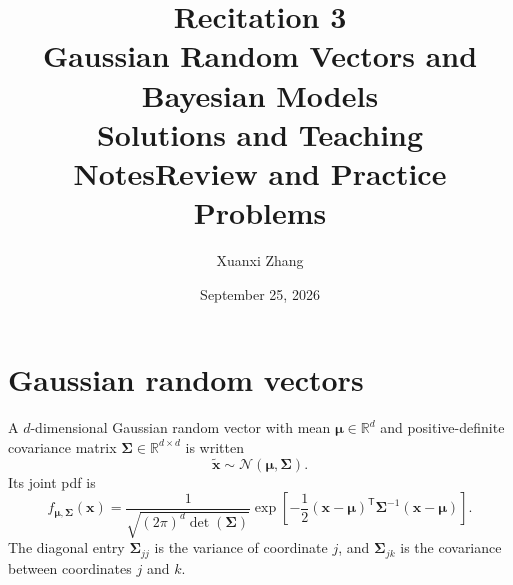 \documentclass[11pt]{article}
\title{\huge Recitation 3\\[0.35em]
  \normalsize Gaussian Random Vectors and Bayesian Models\\[0.35em]
  \large\ifsolutions Solutions and Teaching Notes\else Review and Practice Problems\fi}
\author{Xuanxi Zhang}
\date{September 25, 2026}
\newif\ifsolutions
\newcommand{\R}{\mathbb{R}}
\newcommand{\rvv}[1]{\widetilde{\bm{#1}}}
\begin{document}
\maketitle

\ifsolutions
\section*{Pacing guide (75 minutes)}
\begin{center}
\begin{tabular}{@{}lll@{}}
\toprule
Time & Activity & Suggested use \\
\midrule
0--25 min & Review & Gaussian vectors, mean MLE, Bayesian updating \\
25--37 min & Problem 1 & 6 min individual work, then discussion \\
37--55 min & Problem 2 & 9 min individual work, then discussion \\
55--69 min & Problem 3 & 7 min individual work, then discussion \\
69--75 min & Wrap-up or Problem 4 & Use Problem 4 only if the class is ahead \\
\bottomrule
\end{tabular}
\end{center}

\paragraph{Teaching emphasis.}
For Gaussian maximum likelihood, derive only the mean-vector estimate.  Treat
the covariance matrix as fixed during that derivation; the matrix derivative
for estimating the covariance is outside today's scope.  In the Bayesian
section, keep the parameter random and distinguish the prior, likelihood, and
posterior at every step.
\fi

\section{Gaussian random vectors}

A $d$-dimensional Gaussian random vector with mean $\bm{\mu}\in\R^d$ and
positive-definite covariance matrix $\bm{\Sigma}\in\R^{d\times d}$ is written
\[
  \rvv{x}\sim\mathcal N(\bm{\mu},\bm{\Sigma}).
\]
Its joint pdf is
\[
  f_{\bm{\mu},\bm{\Sigma}}(\bm{x})
  =\frac{1}{\sqrt{(2\pi)^d\det(\bm{\Sigma})}}
   \exp\!\left[-\frac12(\bm{x}-\bm{\mu})^{\mathsf T}
     \bm{\Sigma}^{-1}(\bm{x}-\bm{\mu})\right].
\]
The diagonal entry $\bm{\Sigma}_{jj}$ is the variance of coordinate $j$, and
$\bm{\Sigma}_{jk}$ is the covariance between coordinates $j$ and $k$.
\end{document}
